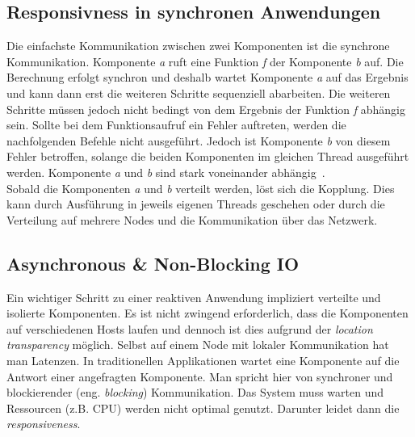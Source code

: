 \subsection{Responsivness in synchronen Anwendungen}
Die einfachste Kommunikation zwischen zwei Komponenten ist die synchrone Kommunikation. Komponente \textit{a} ruft eine Funktion \textit{f} der Komponente \textit{b} auf. Die Berechnung erfolgt synchron und deshalb wartet Komponente \textit{a} auf das Ergebnis und kann dann erst die weiteren Schritte sequenziell abarbeiten. Die weiteren Schritte müssen jedoch nicht bedingt von dem Ergebnis der Funktion \textit{f} abhängig sein. Sollte bei dem Funktionsaufruf ein Fehler auftreten, werden die nachfolgenden Befehle nicht ausgeführt. Jedoch ist Komponente \textit{b} von diesem Fehler betroffen, solange die beiden Komponenten im gleichen Thread ausgeführt werden. Komponente \textit{a} und \textit{b} sind stark voneinander abhängig~\cite[S.~22]{kuhn_reactive_2015}.\\
Sobald die Komponenten \textit{a} und \textit{b} verteilt werden, löst sich die Kopplung. Dies kann durch Ausführung in jeweils eigenen Threads geschehen oder durch die Verteilung auf mehrere Nodes und die Kommunikation über das Netzwerk.\\


\subsection{Asynchronous \& Non-Blocking IO}
Ein wichtiger Schritt zu einer reaktiven Anwendung impliziert verteilte und isolierte Komponenten. Es ist nicht zwingend erforderlich, dass die Komponenten auf verschiedenen Hosts laufen und dennoch ist dies aufgrund der \textit{location transparency} möglich. Selbst auf einem Node mit lokaler Kommunikation hat man Latenzen. In traditionellen Applikationen wartet eine Komponente auf die Antwort einer angefragten Komponente. Man spricht hier von synchroner und blockierender (eng. \textit{blocking}) Kommunikation. Das System muss warten und Ressourcen (z.B. CPU) werden nicht optimal genutzt. Darunter leidet dann die \textit{responsiveness}.


